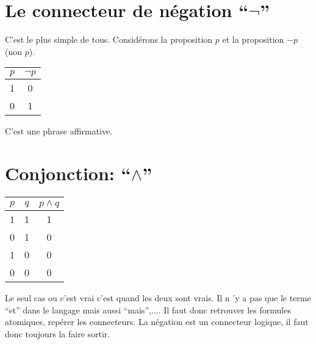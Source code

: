 \section{Le connecteur de négation ``$\lnot$''}
C'est le plus simple de tous. Considérons la proposition $p$ et la proposition $-p$ (non $p$).
\begin{center}
	\begin{tabular}{|c|c|}
		\hline
		$p$&$\lnot p$\\
		\hline
		1&0\\
		\hline
		0&1\\
		\hline
	\end{tabular}
\end{center}
C'est une phrase affirmative.
\section{Conjonction: ``$\land$''}
\begin{center}
	\begin{tabular}{|c|c|c|}
		\hline
		$p$&$q$&$p \land q$\\
		\hline
		1&1&1\\
		\hline
		0&1&0\\
		\hline
		1&0&0\\
		\hline
		0&0&0\\
		\hline
	\end{tabular}
\end{center}
Le seul cas ou c'est vrai c'est quand les deux sont vrais.
Il n 'y a pas que le terme ``et'' dans le langage mais aussi ``mais'',$...$.
Il faut donc retrouver les formules atomiques, repérer les connecteurs.
La négation est un connecteur logique, il faut donc toujours la faire sortir.

